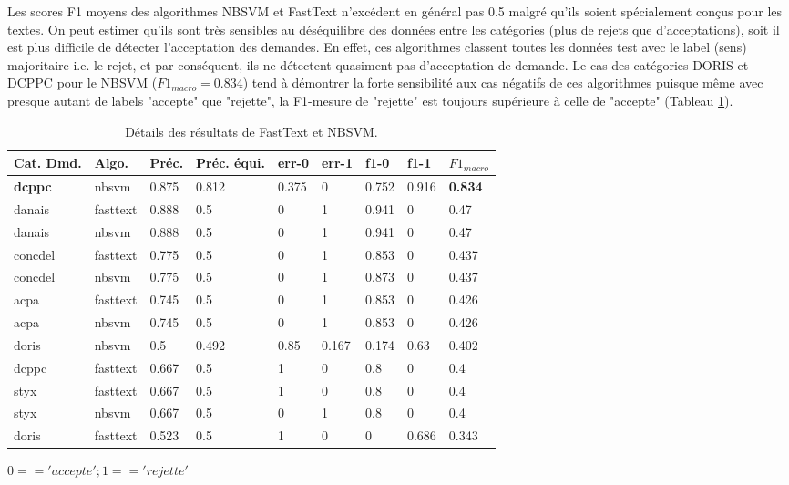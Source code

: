 Les scores F1 moyens des algorithmes  NBSVM et FastText n'excédent en général pas 0.5 malgré qu'ils soient spécialement conçus pour les textes. On peut estimer qu'ils sont très sensibles au déséquilibre des données entre les catégories (plus de rejets que d'acceptations), soit il est plus difficile de détecter l'acceptation des demandes. En effet, ces algorithmes classent toutes les données test avec le label (sens) majoritaire i.e. le rejet, et par conséquent, ils ne détectent quasiment pas d'acceptation de demande. Le cas des catégories DORIS et DCPPC pour le NBSVM ($F1_{macro} = 0.834$) tend à démontrer la forte sensibilité aux cas négatifs de ces algorithmes puisque même avec presque autant de labels "accepte" que "rejette", la F1-mesure de "rejette" est toujours supérieure à celle de "accepte" (Tableau \ref{tab:sensrst:fasttextnbsvm}). 
 
 \begin{table}[htb]
 	\footnotesize \centering
 	\begin{tabular}{|l|l|l|l|l|l|l|l|l|}
 		\hline
 	\textbf{Cat. Dmd.} & \textbf{Algo.} & \textbf{Préc.}   & \textbf{Préc. équi.} & \textbf{err-0} & \textbf{err-1} & \textbf{f1-0}  & \textbf{f1-1}  & \textbf{$F1_{macro}$} \\ \hline
 	\textbf{dcppc}       & nbsvm      & 0.875 & 0.812        & 0.375 & 0     & 0.752 & 0.916 & \textbf{0.834}        \\ \hline
 	danais      & fasttext   & 0.888 & 0.5          & 0     & 1     & 0.941    & 0 & 0.47         \\ \hline
 	danais      & nbsvm      & 0.888 & 0.5          & 0     & 1     & 0.941 & 0     & 0.47         \\ \hline
 	concdel     & fasttext   & 0.775 & 0.5          & 0     & 1     & 0.853     & 0 & 0.437        \\ \hline
 	concdel     & nbsvm      & 0.775 & 0.5          & 0     & 1     & 0.873 & 0     & 0.437        \\ \hline
 	acpa        & fasttext   & 0.745 & 0.5          & 0     & 1     & 0.853     & 0 & 0.426        \\ \hline
 	acpa        & nbsvm      & 0.745 & 0.5          & 0     & 1     & 0.853 & 0     & 0.426        \\ \hline
 	doris       & nbsvm      & 0.5   & 0.492        & 0.85  & 0.167 & 0.174 & 0.63  & 0.402        \\ \hline
 	dcppc       & fasttext   & 0.667 & 0.5          & 1     & 0     & 0.8   & 0     & 0.4          \\ \hline
 	styx        & fasttext   & 0.667 & 0.5          & 1     & 0     & 0.8     & 0   & 0.4          \\ \hline
 	styx        & nbsvm      & 0.667 & 0.5          & 0     & 1     & 0.8   & 0     & 0.4          \\ \hline
 	doris & fasttext & 0.523 & 0.5 & 1 & 0 & 0 & 0.686 & 0.343 \\ \hline
 	\end{tabular}
 	
 $0 == 'accepte'; 1 == 'rejette'$

\caption{Détails des résultats de FastText et NBSVM.}\label{tab:sensrst:fasttextnbsvm}
 \end{table}

